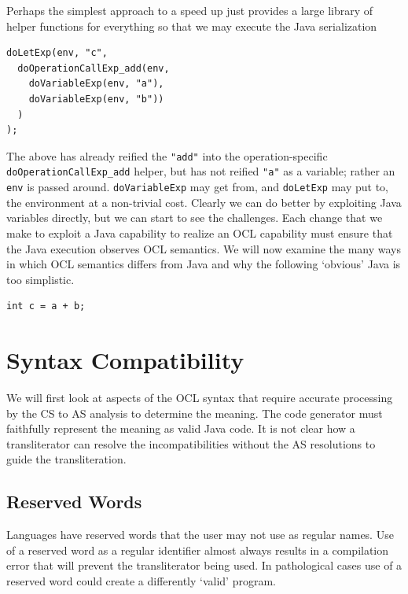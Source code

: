 \documentclass[sigconf]{acmart}
\begin{document}
Perhaps the simplest approach to a speed up just provides a large library of helper functions for everything so that we may execute the Java serialization

\begin{verbatim}
doLetExp(env, "c", 
  doOperationCallExp_add(env, 
    doVariableExp(env, "a"),
    doVariableExp(env, "b"))
  )
);
\end{verbatim}

The above has already reified the \verb|"add"| into the operation-specific \verb|doOperationCallExp_add| helper, but has not reified \verb|"a"| as a variable; rather an \verb|env| is passed around. \verb|doVariableExp| may get from, and  \verb|doLetExp| may put to, the environment at a non-trivial cost. Clearly we can do better by exploiting Java variables directly, but we can start to see the challenges. Each change that we make to exploit a Java capability to realize an OCL capability must ensure that the Java execution observes OCL semantics. We will now examine the many ways in which OCL semantics differs from Java and why the following `obvious' Java is too simplistic.

\begin{verbatim}
int c = a + b;
\end{verbatim}


\section{Syntax Compatibility}\label{Syntax Compatibility}

We will first look at aspects of the OCL syntax that require accurate processing by the CS to AS analysis to determine the meaning. The code generator must faithfully represent the meaning as valid Java code. It is not clear how a transliterator can resolve the incompatibilities without the AS resolutions to guide the transliteration.

\subsection{Reserved Words}

Languages have reserved words that the user may not use as regular names. Use of a reserved word as a regular identifier almost always results in a compilation error that will prevent the transliterator being used. In pathological cases use of a reserved word could create a differently `valid' program.
\end{document}

